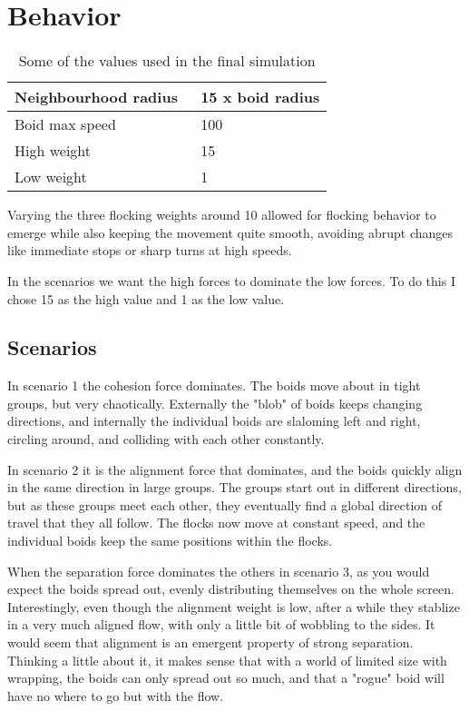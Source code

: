 \section*{Behavior}
\begin{table}[h!]
    \begin{tabular}{l|l}
    Neighbourhood radius~ & 15 x boid radius \\\hline
    Boid max speed & 100 \\\hline
    High weight & 15 \\\hline
    Low weight & 1 \\
    \end{tabular}
    \caption{Some of the values used in the final simulation}
\end{table}

Varying the three flocking weights around 10 allowed for flocking behavior to emerge while also keeping the movement quite smooth, avoiding  abrupt changes like immediate stops or sharp turns at high speeds.

In the scenarios we want the high forces to dominate the low forces.
To do this I chose 15 as the high value and 1 as the low value.

\subsection*{Scenarios}
In scenario 1 the cohesion force dominates.
The boids move about in tight groups, but very chaotically.
Externally the "blob" of boids keeps changing directions, and internally the individual boids are slaloming left and right, circling around, and colliding with each other constantly.

In scenario 2 it is the alignment force that dominates, and the boids quickly align in the same direction in large groups.
The groups start out in different directions, but as these groups meet each other, they eventually find a global direction of travel that they all follow.
The flocks now move at constant speed, and the individual boids keep the same positions within the flocks.

When the separation force dominates the others in scenario 3, as you would expect the boids spread out, evenly distributing themselves on the whole screen.
Interestingly, even though the alignment weight is low, after a while they stablize in a very much aligned flow, with only a little bit of wobbling to the sides.
It would seem that alignment is an emergent property of strong separation.
Thinking a little about it, it makes sense that with a world of limited size with wrapping,
the boids can only spread out so much, and that a "rogue" boid will have no where to go but with the flow.


